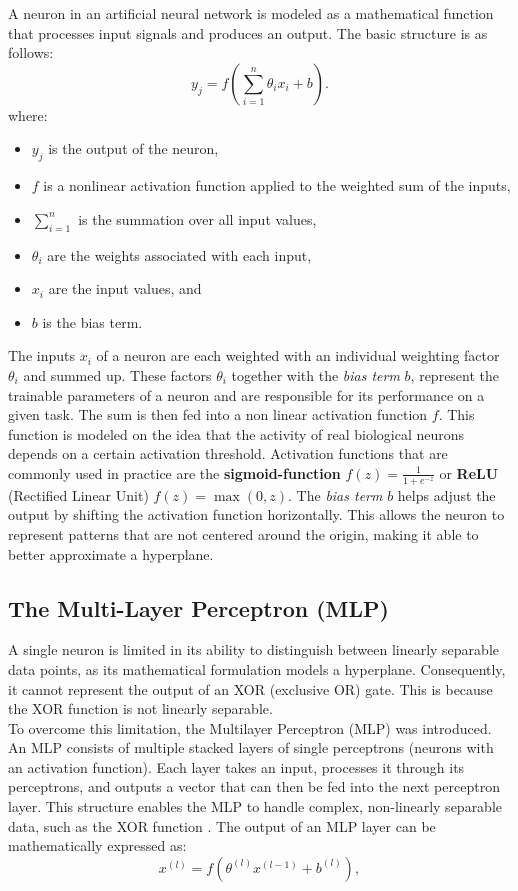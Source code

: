A neuron in an artificial neural network is modeled as a mathematical function that processes input signals and produces an output. The basic structure is as follows:
\[
y_j = f \left( \sum_{i=1}^{n} \theta_i x_i + b \right).
\]
where:
\begin{itemize}
    \item \( y_j \) is the output of the neuron,
    \item \( f \) is a nonlinear activation function applied to the weighted sum of the inputs,
    \item \( \sum_{i=1}^{n} \) is the summation over all input values,
    \item \( \theta_i \) are the weights associated with each input,
    \item \( x_i \) are the input values, and
    \item \( b \) is the bias term.
\end{itemize}
The inputs $x_i$ of a neuron are each weighted with an individual weighting factor $\theta_i$ and summed up.
These factors $\theta_i$ together with the \emph{bias term} $b$,
represent the trainable parameters of a neuron and are responsible for its performance on a given task.
The sum is then fed into a non linear activation function $f$.
This function is modeled on the idea that the activity of real biological neurons depends on a certain activation threshold\cite{GrundkursAI}.
Activation functions that are commonly used in practice are the \textbf{sigmoid-function}  $f(z) = \frac{1}{1 + e^{-z}}$ or \textbf{ReLU} (Rectified Linear Unit) $f(z) = \max(0, z)$\cite{nair2010rectified}.
The \emph{bias term} $b$ helps adjust the output by shifting the activation function horizontally.
This allows the neuron to represent patterns that are not centered around the origin, making it able to better approximate a hyperplane\cite{GrundkursAI}.

\subsection{The Multi-Layer Perceptron (MLP)\cite{Goodfellow-et-al-2016}}
\label{sec:mlp}

A single neuron is limited in its ability to distinguish between linearly separable data points, as its mathematical formulation models a hyperplane. Consequently, it cannot represent the output of an XOR (exclusive OR) gate.
This is because the XOR function is not linearly separable.\cite{Goodfellow-et-al-2016}\\
To overcome this limitation, the Multilayer Perceptron (MLP) was introduced.
An MLP consists of multiple stacked layers of single perceptrons (neurons with an activation function).
Each layer takes an input, processes it through its perceptrons, and outputs a vector that can then be fed into the next perceptron layer.
This structure enables the MLP to handle complex, non-linearly separable data, such as the XOR function \cite{Goodfellow-et-al-2016}.
The output of an MLP layer can be mathematically expressed as:
\[
x^{(l)} = f \left( \theta^{(l)} x^{(l-1)} + b^{(l)} \right),
\]

